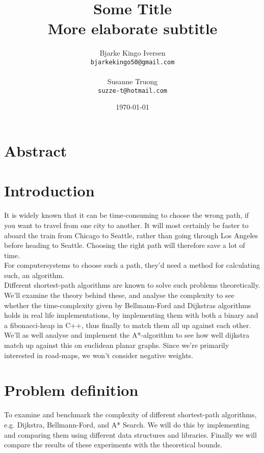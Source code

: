 \documentclass[11pt]{article}
\title{
  \vspace{3cm}
  \Huge{Some Title} \\
  \Large{More elaborate subtitle}
}
\author{
  \Large{Bjarke Kingo Iversen}
  \\ \texttt{bjarkekingo50@gmail.com} \\\\
  \Large{Susanne Truong}
  \\ \texttt{suzze-t@hotmail.com}
}
\date{
    \today
}
\def \ColourPDF {include/ku-farve}
\def \TitlePDF   {include/ku-en}  %
\begin{document}


\clearpage\maketitle
\thispagestyle{empty}

\newpage

\section{Abstract}
\newpage
\tableofcontents
\newpage
\section{Introduction}
It is widely known that it can be time-consuming to choose the wrong path, if you want to travel from one city to another. It will most certainly be faster to aboard the train from Chicago to Seattle, rather than going through Los Angeles before heading to Seattle. Choosing the right path will therefore save a lot of time.\\
For computersystems to choose such a path, they'd need a method for calculating such, an algorithm.\\
Different shortest-path algorithms are known to solve such problems theoretically. We'll examine the theory behind these, and analyse the complexity to see whether the time-complexity given by Bellmann-Ford and Dijkstras algorithms holds in real life implementations, by implementing them with both a binary and a fibonacci-heap in C++, thus finally to match them all up against each other.\\
We'll as well analyse and implement the A*-algorithm to see how well dijkstra match up against this on euclidean planar graphs. Since we're primarily interested in road-maps, we won't consider negative weights.\\

\section{Problem definition}
To examine and benchmark the complexity of different shortest-path algorithms, e.g. Dijkstra, Bellmann-Ford, and A* Search. We will do this by implementing and comparing them using different data structures and libraries. Finally we will compare the results of these experiments with the theoretical bounds.
\end{document}
